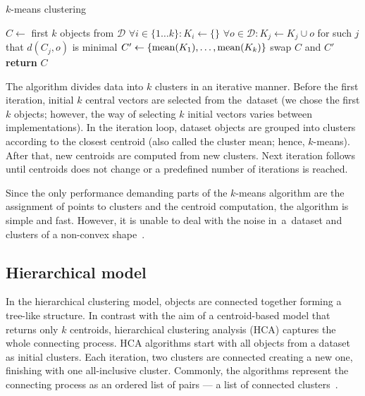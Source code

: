 \begin{algorithm}[t]
	\caption{$k$-means clustering}
	\label{alg01:kmeans}
	\begin{algorithmic}[1]
		\State $C \gets$ first $k$ objects from  $\mathcal{D}$ 
		\Repeat
			\State $\forall i \in \{1\dots k\}:K_i \gets \{\}$  
			\State $\forall o \in \mathcal{D}:K_{j} \gets K_{j} \cup o$ for such $j$ that $d(C_j,o)$ is minimal 
			\State $C' \gets \{\operatorname{mean}(K_1),\dots,\operatorname{mean}(K_k)\}$
			\State swap $C$ and $C'$
		\State \textbf{return} $C$
		\EndProcedure
	\end{algorithmic}
\end{algorithm}


The algorithm divides data into $k$ clusters in an iterative manner. Before the first iteration, initial $k$ central vectors are selected from the~dataset (we chose the first $k$ objects; however, the way of selecting $k$ initial vectors varies between 
implementations). In the iteration loop, dataset objects are grouped into clusters according to the closest centroid (also called the cluster mean; hence, $k$-means). After that, new centroids are computed from new clusters. Next iteration follows until centroids does not change or a predefined number of iterations is reached. 

Since the only performance demanding parts of the $k$-means algorithm are the assignment of points to clusters and the centroid computation, the algorithm is simple and fast. However, it is unable to deal with the noise in~a~dataset and clusters of a non-convex shape~\cite{uppada2014centroid}.
  

\subsection{Hierarchical model}
\label{sec01:hierarch_clust}

In the hierarchical clustering model, objects are connected together forming a tree-like structure. In contrast with the aim of a centroid-based model that returns only $k$ centroids, hierarchical clustering analysis (HCA) captures the whole connecting process. HCA algorithms start with all objects from a dataset as initial clusters. Each iteration, two clusters are connected creating a new one, finishing with one all-inclusive cluster. Commonly, the algorithms represent the connecting process as an ordered list of pairs --- a list of connected clusters~\cite{karypis1999chameleon}.

